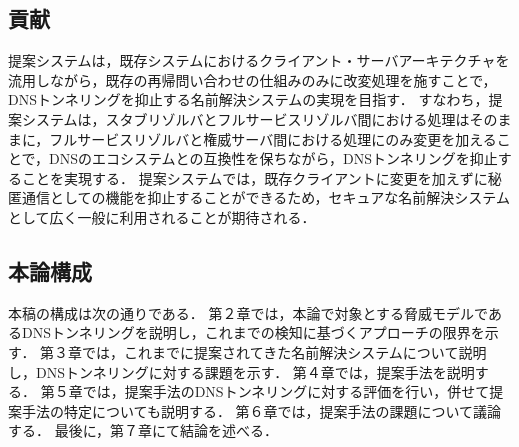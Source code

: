 \subsection{貢献}
提案システムは，既存システムにおけるクライアント・サーバアーキテクチャを流用しながら，既存の再帰問い合わせの仕組みのみに改変処理を施すことで，DNSトンネリングを抑止する名前解決システムの実現を目指す．
すなわち，提案システムは，スタブリゾルバとフルサービスリゾルバ間における処理はそのままに，フルサービスリゾルバと権威サーバ間における処理にのみ変更を加えることで，DNSのエコシステムとの互換性を保ちながら，DNSトンネリングを抑止することを実現する．
提案システムでは，既存クライアントに変更を加えずに秘匿通信としての機能を抑止することができるため，セキュアな名前解決システムとして広く一般に利用されることが期待される．





\subsection{本論構成}
本稿の構成は次の通りである．
第２章では，本論で対象とする脅威モデルであるDNSトンネリングを説明し，これまでの検知に基づくアプローチの限界を示す．
第３章では，これまでに提案されてきた名前解決システムについて説明し，DNSトンネリングに対する課題を示す．
第４章では，提案手法を説明する．
第５章では，提案手法のDNSトンネリングに対する評価を行い，併せて提案手法の特定についても説明する．
第６章では，提案手法の課題について議論する．
最後に，第７章にて結論を述べる．
